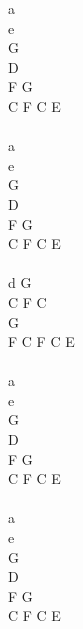 \documentclass[a5paper, 10pt]{book}
\begin{document}
\begin{minipage}[t]{0.5\textwidth}
  a\\
  e\\
  G\\
  D\\
  F G\\
  C F C E\\
  \\
  a\\
  e\\
  G\\
  D\\
  F G\\
  C F C E\\
  \\
  d G\\
  C F C\\
  G\\
  F C F C E\\
  \\
  a\\
  e\\
  G\\
  D\\
  F G\\
  C F C E\\
  \\
  a\\
  e\\
  G\\
  D\\
  F G\\
  C F C E\\
\end{minipage}

\newpage
\end{document}
